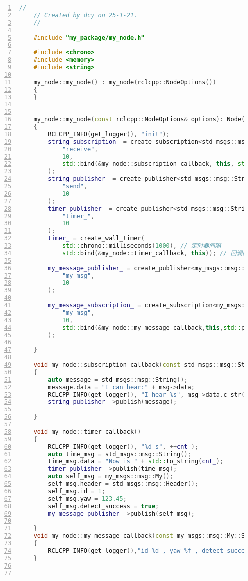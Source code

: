 \begin{lstlisting}[language=c++,label=lst:my_node_cpp,caption=my\_node.cpp,numbers=left]
    //
    // Created by dcy on 25-1-21.
    //
    
    #include "my_package/my_node.h"
    
    #include <chrono>
    #include <memory>
    #include <string>
    
    my_node::my_node() : my_node(rclcpp::NodeOptions())
    {
    }
    
    
    my_node::my_node(const rclcpp::NodeOptions& options): Node("my_node", options)
    {
        RCLCPP_INFO(get_logger(), "init");
        string_subscription_ = create_subscription<std_msgs::msg::String>(
            "receive",
            10,
            std::bind(&my_node::subscription_callback, this, std::placeholders::_1)
        );
        string_publisher_ = create_publisher<std_msgs::msg::String>(
            "send",
            10
        );
        timer_publisher_ = create_publisher<std_msgs::msg::String>(
            "timer_",
            10
        );
        timer_ = create_wall_timer(
            std::chrono::milliseconds(1000), // 定时器间隔
            std::bind(&my_node::timer_callback, this)); // 回调函数
    
        my_message_publisher_ = create_publisher<my_msgs::msg::My>(
            "my_msg",
            10
        );
    
        my_message_subscription_ = create_subscription<my_msgs::msg::My>(
            "my_msg",
            10,
            std::bind(&my_node::my_message_callback,this,std::placeholders::_1)
        );
    
    }
    
    void my_node::subscription_callback(const std_msgs::msg::String::SharedPtr msg)
    {
        auto message = std_msgs::msg::String();
        message.data = "I can hear:" + msg->data;
        RCLCPP_INFO(get_logger(), "I hear %s", msg->data.c_str());
        string_publisher_->publish(message);
    
    }
    
    void my_node::timer_callback()
    {
        RCLCPP_INFO(get_logger(), "%d s", ++cnt_);
        auto time_msg = std_msgs::msg::String();
        time_msg.data = "Now is " + std::to_string(cnt_);
        timer_publisher_->publish(time_msg);
        auto self_msg = my_msgs::msg::My();
        self_msg.header = std_msgs::msg::Header();
        self_msg.id = 1;
        self_msg.yaw = 123.45;
        self_msg.detect_success = true;
        my_message_publisher_->publish(self_msg);
    
    }
    void my_node::my_message_callback(const my_msgs::msg::My::SharedPtr msg)
    {
        RCLCPP_INFO(get_logger(),"id %d , yaw %f , detect_success %d ",msg->id,msg->yaw,msg->detect_success);
    }
    
    
\end{lstlisting}

